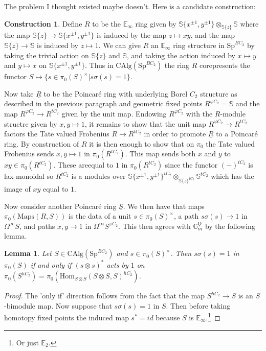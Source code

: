 \documentclass{article}
\renewcommand{\phi}{\varphi}
\newtheorem{lemma}[equation]{Lemma}
\theoremstyle{definition}
\newtheorem{construction}[equation]{Construction}
\begin{document}
The problem I thought existed maybe doesn't. Here is a candidate construction:

\begin{construction}
Define $R$ to be the $\mathbb{E}_\infty$ ring given by $\mathbb{S}\{x^{\pm 1}, y^{\pm 1}\}\otimes_{\mathbb{S}\{z\}}\mathbb{S}$ where the map $\mathbb{S}\{z\}\to \mathbb{S}\{x^{\pm 1}, y^{\pm 1}\}$ is induced by the map $z\mapsto xy$, and the map $\mathbb{S}\{z\}\to \mathbb{S}$ is induced by $z\mapsto 1$. We can give $R$ an $\mathbb{E}_\infty$ ring structure in $\mathrm{Sp}^{BC_2}$ by taking the trivial action on $\mathbb{S}\{z\}$ and $\mathbb{S}$, and taking the action induced by $x\mapsto y$ and $y\mapsto x$ on $\mathbb{S}\{x^{\pm 1}, y^{\pm 1}\}$. Thus in $\mathrm{CAlg}(\mathrm{Sp}^{BC_2})$ the ring $R$ corepresents the functor $S\mapsto \{s\in \pi_0(S)^\times| s\sigma(s)=1\}$.

Now take $\underline{R}$ to be the Poincar{\'e} ring with underlying Borel $C_2$ structure as described in the previous paragraph and geometric fixed points $R^{\phi C_2}=\mathbb{S}$ and the map $R^{\phi C_2}\to R^{tC_2}$ given by the unit map. Endowing $R^{\phi C_2}$ with the $R$-module structre given by $x,y\mapsto 1$, it remains to show that the unit map $R^{\phi C_2}\to R^{tC_2}$ factors the Tate valued Frobenius $R\to R^{tC_2}$ in order to promote $\underline{R}$ to a Poincar{\'e} ring. By construction of $R$ it is then enough to show that on $\pi_0$ the Tate valued Frobenius sends $x,y\mapsto 1$ in $\pi_0(R^{tC_2})$. This map sends both $x$ and $y$ to $xy\in \pi_0(R^{tC_2})$. These areequal to $1$ in $\pi_0(R^{tC_2})$ since the functor $(-)^{tC_2}$ is lax-monoidal so $R^{tC_2}$ is a modules over $\mathbb{S}\{x^{\pm 1}, y^{\pm 1}\}^{tC_2}\otimes_{\mathbb{S}\{z\}^{tC_2}}\mathbb{S}^{tC_2}$ which has the image of $xy$ equal to $1$. 
\end{construction}

Now consider another Poincar{\'e} ring $\underline{S}$. We then have that maps $\pi_0(\mathrm{Maps}(\underline{R},\underline{S}))$ is the data of a unit $s\in \pi_0(S)^\times$, a path $s\sigma(s)\to 1$ in $\Omega^\infty S$, and paths $x,y\to 1$ in $\Omega^\infty S^{\phi C_2}$.  This then agrees with $\mathbb{G}_m^\Qoppa$ by the following lemma.

\begin{lemma}
Let $S\in \mathrm{CAlg}(\mathrm{Sp}^{BC_2})$ and $s\in \pi_0(S)^\times$. Then $s\sigma(s)=1$ in $\pi_0(S)$ if and only if $(s\otimes s)^*$ acts by $1$ on $\pi_0(S^{hC_2})=\pi_0(\mathrm{Hom}_{S\otimes S}(S\otimes S, S)^{hC_2})$.
\end{lemma}
\begin{proof}
The 'only if' direction follows from the fact that the map $S^{hC_2}\to S$ is an $S$-bimodule map. Now suppose that $s\sigma(s)=1$ in  $S$. Then before taking homotopy fixed points the induced map $s^*=id$ because $S$ is $\mathbb{E}_\infty$.\footnote{Or just $\mathbb{E}_2$.} 
\end{proof}
\end{document}
